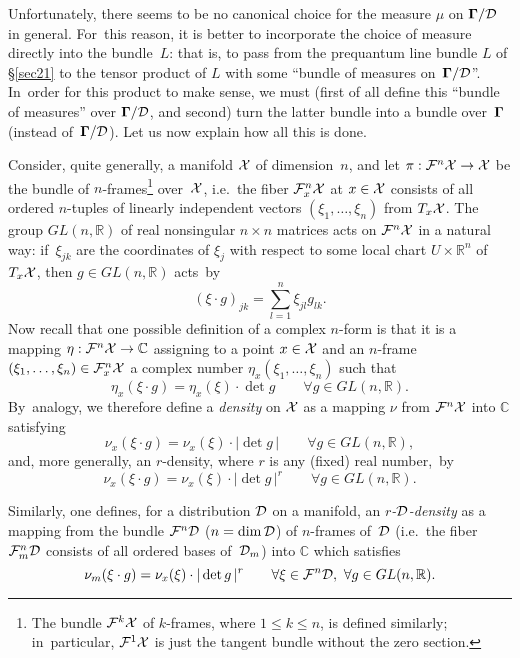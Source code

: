 \documentclass[11pt]{amsart}
\numberwithin{equation}{section}
\theoremstyle{remark}
\newcommand\Omg{{\bigam}}   %
\newcommand\FF{\Cal F}
\newcommand\DD{{\Cal D}}
\newcommand\MD{{\Omg/\DD}}
\newcommand\RR{\mathbb R}
\newcommand{\CC}{\C}
\newcommand{\bigam}{\mbox{\boldmath $\Gamma$}}
\newcommand{\C}{\mathbb C}
\begin{document}
Unfortunately, there seems to be no canonical choice for the measure $\mu$ on
$\MD$ in general. For~this reason, it is better to incorporate the choice of
measure directly into the bundle~$L$: that is, to pass from the prequantum line
bundle $L$ of \S\ref{sec21} to the tensor product of $L$  with some ``bundle of
measures on~$\MD$''. In~order for this product to make sense, we must (first
of all define this ``bundle of measures'' over $\MD$, and second) turn the
latter bundle into a bundle over~$\Omg$ (instead of~$\MD$). Let us now explain
how all this is done.

Consider, quite generally, a manifold ${\mathcal X}$ of dimension~$n$, and let
$\pi:\FF^n\xX\to\xX$ be the bundle of $n$-frames\footnote{The bundle $\FF^k\xX$
of $k$-frames, where $1\le k\le n$, is defined similarly; in~particular,
$\FF^1\xX$ is just the tangent bundle without the zero section.} over~${\mathcal X}$,
i.e.~the fiber $\FF^n_x\xX$ at $x\in{\mathcal X}$ consists of all ordered $n$-tuples of
linearly independent vectors $(\xi_1,\dots,\xi_n)$ from $T_x{\mathcal X}$. The group
$GL(n,\RR)$ of real nonsingular $n\times n$ matrices acts on $\FF^n\xX$ in a
natural way: if~$\xi_{jk}$ are the coordinates of $\xi_j$ with respect to some
local chart $U\times\RR^n$ of $T_x{\mathcal X}$, then $g\in GL(n,\RR)$ acts~by
$$ (\xi\cdot g)_{jk} = \sum_{l=1}^n \xi_{jl} g_{lk}.  $$
Now recall that one possible definition of a complex $n$-form is that it is a
mapping $\eta:\FF^n\xX\to\CC$ assigning to a point $x\in{\mathcal X}$ and an $n$-frame
$(\xi_1,\dots,\xi_n)\in\FF^n_x\xX$ a complex number $\eta_x(\xi_1,\dots,\xi_n)$
such that
$$ \eta_x(\xi\cdot g) = \eta_x(\xi)\cdot\det g \qquad\forall g\in GL(n,\RR). $$
By~analogy, we therefore define a {\sl density\/} on ${\mathcal X}$ as a mapping $\nu$
from $\FF^n\xX$ into $\CC$ satisfying
$$ \nu_x(\xi\cdot g)=\nu_x(\xi)\cdot|\det g\,| \qquad\forall g\in GL(n,\RR), $$
and, more generally, an $r$-density, where $r$ is any (fixed) real number,~by
\begin{equation}  \nu_x(\xi\cdot g) = \nu_x(\xi)\cdot|\det g\,|^r
\qquad \forall g\in GL(n,\RR).    \label{tag:HDA}  \end{equation}

Similarly, one defines, for a distribution $\DD$ on a manifold, an {\sl
$r$-$\DD$-density\/} as a mapping from the bundle $\FF^n\DD$ ($n=\dim\DD$) of
$n$-frames of~$\DD$ (i.e.~the fiber $\FF^n_m\DD$ consists of all ordered bases
of~$\DD_m$) into $\CC$ which satisfies
\begin{equation}  \nu_m(\xi\cdot g)=\nu_x(\xi)\cdot|\det g\,|^r
\qquad\forall\xi\in\FF^n\DD, \ \forall g\in GL(n,\RR).  \label{tag:HDB}
\end{equation}
\end{document}
